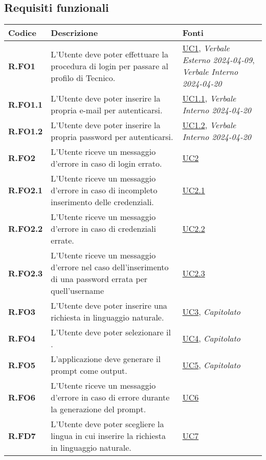 \subsection{Requisiti funzionali}
\begin{longtable}{|P{3cm}|P{6,5cm}|>{\arraybackslash}P{4cm}|}
    \hline
    \textbf{Codice} & \textbf{Descrizione} & \textbf{Fonti} \\
    \hline
    \textbf{R.FO1} & L’Utente deve poter effettuare la procedura di login per passare al profilo di Tecnico. &  \hyperref[UC1]{UC1}, \emph{Verbale Esterno 2024-04-09}, \emph{Verbale Interno 2024-04-20}\\
    \hline
    \textbf{R.FO1.1} & L’Utente deve poter inserire la propria e-mail per autenticarsi. & \hyperref[UC1point1]{UC1.1}, \emph{Verbale Interno 2024-04-20}\\
    \hline
    \textbf{R.FO1.2} & L’Utente deve poter inserire la propria password per autenticarsi. & \hyperref[UC1point2]{UC1.2}, \emph{Verbale Interno 2024-04-20}\\
    \hline
    \textbf{R.FO2} & L'Utente riceve un messaggio d'errore in caso di login errato. &  \hyperref[UC2]{UC2}\\
    \hline
    \textbf{R.FO2.1} & L'Utente  riceve un messaggio d'errore in caso di incompleto inserimento delle credenziali. & \hyperref[UC2point1]{UC2.1}\\
    \hline
    \textbf{R.FO2.2} & L’Utente  riceve un messaggio d'errore in caso di credenziali errate. & \hyperref[UC2point2]{UC2.2}\\
    \hline
    \textbf{R.FO2.3} & L’Utente  riceve un messaggio d'errore nel caso dell'inserimento di una password errata per quell'username & \hyperref[UC2point3]{UC2.3}\\
    \hline
    \textbf{R.FO3} & L’Utente  deve poter inserire una richiesta in linguaggio naturale. &  \hyperref[UC3]{UC3}, \emph{Capitolato}\\
    \hline
    \textbf{R.FO4} & L’Utente  deve poter selezionare il . &  \hyperref[UC4]{UC4}, \emph{Capitolato}\\
    \hline
    \textbf{R.FO5} & L'applicazione deve generare il prompt come output. &  \hyperref[UC5]{UC5}, \emph{Capitolato}\\
    \hline
    \textbf{R.FO6} & L’Utente  riceve un messaggio d'errore in caso di errore durante la generazione del prompt. &  \hyperref[UC6]{UC6}\\
    \hline
    \textbf{R.FD7} & L’Utente  deve poter scegliere la lingua in cui inserire la richiesta in linguaggio naturale. &  \hyperref[UC7]{UC7}\\

\end{longtable}
